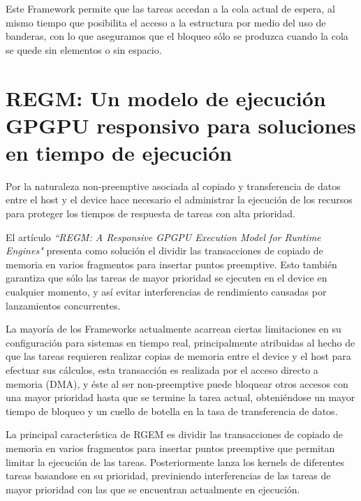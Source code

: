 Este Framework permite que las tareas accedan a la cola actual de espera, al mismo tiempo que posibilita el acceso a la estructura por medio del uso de banderas, con lo que aseguramos que el bloqueo sólo se produzca cuando la cola se quede sin elementos o sin espacio.

\section{REGM: Un modelo de ejecución GPGPU responsivo para soluciones en tiempo de ejecución}

Por la naturaleza non-preemptive asociada al copiado y transferencia de datos entre el host y el device hace necesario el administrar la ejecución de los recursos para proteger los tiempos de respuesta de tareas con alta prioridad. 

El artículo \textit{``REGM: A Responsive GPGPU Execution Model for Runtime Engines"}\cite{REGM} presenta como solución el dividir las transacciones de copiado de memoria en varios fragmentos para insertar puntos preemptive. Esto también garantiza que sólo las tareas de mayor prioridad se ejecuten en el device en cualquier momento, y así evitar interferencias de rendimiento causadas por lanzamientos concurrentes.

\vspace{0.3cm}

La mayoría de los Frameworks actualmente acarrean ciertas limitaciones en su configuración para sistemas en tiempo real, principalmente atribuidas al hecho de que las tareas requieren realizar copias de memoria entre el device y el host para efectuar sus cálculos, esta transacción es realizada por el acceso directo a memoria (DMA), y éste al ser non-preemptive puede bloquear otros accesos con una mayor prioridad hasta que se termine la tarea actual, obteniéndose un mayor tiempo de bloqueo y un cuello de botella en la tasa de transferencia de datos.

\vspace{0.3cm}

La principal característica de RGEM es dividir las transacciones de copiado de memoria en varios fragmentos para insertar puntos preemptive que permitan limitar la ejecución de las tareas. Posteriormente lanza los kernels de diferentes tareas basandose en su prioridad, previniendo interferencias de las tareas de mayor prioridad con las que se encuentran actualmente en ejecución.

